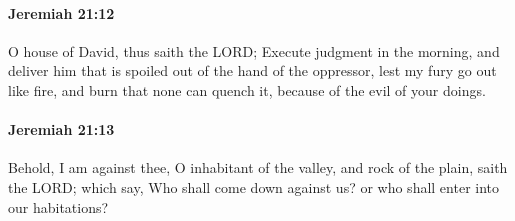 		\paragraph{Jeremiah 21:12} %
			\label{JEREMIAH-21-12}

			O house of David, thus saith the LORD; Execute judgment in the morning, and deliver him that is spoiled out of the hand of the oppressor, lest my fury go out like fire, and burn that none can quench it, because of the evil of your doings.


		\paragraph{Jeremiah 21:13} %
			\label{JEREMIAH-21-13}

			Behold, I am against thee, O inhabitant of the valley, and rock of the plain, saith the LORD; which say, Who shall come down against us? or who shall enter into our habitations?

